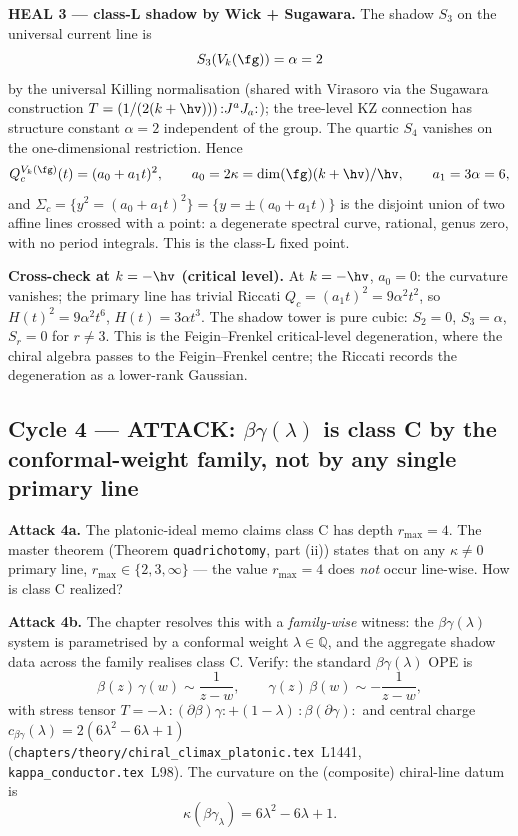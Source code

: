 \textbf{HEAL 3 --- class-L shadow by Wick + Sugawara.} The shadow
$S_3$ on the universal current line is
\[
  S_3(V_k(\fg)) = \alpha = 2
\]
by the universal Killing normalisation (shared with Virasoro via the
Sugawara construction $T = (1/(2(k+\hv)))\,{:}J^a J_a{:}$); the
tree-level KZ connection has structure constant $\alpha = 2$
independent of the group. The quartic $S_4$ vanishes on the
one-dimensional restriction. Hence
\[
  Q_c^{V_k(\fg)}(t) = (a_0 + a_1 t)^2,
  \qquad a_0 = 2\kappa = \dim(\fg)(k+\hv)/\hv,
  \qquad a_1 = 3\alpha = 6,
\]
and $\Sigma_c = \{y^2 = (a_0+a_1 t)^2\} = \{y = \pm(a_0 + a_1 t)\}$
is the disjoint union of two affine lines crossed with a point: a
degenerate spectral curve, rational, genus zero, with no period
integrals. This is the class-L fixed point.

\textbf{Cross-check at $k = -\hv$ (critical level).} At $k = -\hv$,
$a_0 = 0$: the curvature vanishes; the primary line has trivial
Riccati $Q_c = (a_1 t)^2 = 9\alpha^2 t^2$, so $H(t)^2 = 9\alpha^2 t^6$,
$H(t) = 3\alpha t^3$. The shadow tower is pure cubic: $S_2 = 0$,
$S_3 = \alpha$, $S_r = 0$ for $r \ne 3$. This is the Feigin--Frenkel
critical-level degeneration, where the chiral algebra passes to the
Feigin--Frenkel centre; the Riccati records the degeneration as a
lower-rank Gaussian.

\subsection*{Cycle 4 --- ATTACK: $\beta\gamma(\lambda)$ is
class C by the conformal-weight family, not by any single primary line}

\textbf{Attack 4a.} The platonic-ideal memo claims class C has depth
$r_{\max} = 4$. The master theorem (Theorem
\texttt{quadrichotomy}, part (ii)) states that on any $\kappa \ne 0$
primary line, $r_{\max} \in \{2, 3, \infty\}$ --- the value $r_{\max}
= 4$ does \emph{not} occur line-wise. How is class C realized?

\textbf{Attack 4b.} The chapter resolves this with a \emph{family-wise}
witness: the $\beta\gamma(\lambda)$ system is parametrised by a
conformal weight $\lambda \in \mathbb Q$, and the aggregate shadow
data across the family realises class C. Verify: the standard
$\beta\gamma(\lambda)$ OPE is
\[
  \beta(z)\,\gamma(w) \sim \frac{1}{z-w},
  \qquad
  \gamma(z)\,\beta(w) \sim -\frac{1}{z-w},
\]
with stress tensor $T = -\lambda\,{:}(\partial\beta)\gamma{:} +
(1-\lambda)\,{:}\beta(\partial\gamma){:}$ and central charge
$c_{\beta\gamma}(\lambda) = 2(6\lambda^2 - 6\lambda + 1)$
(\texttt{chapters/theory/chiral\_climax\_platonic.tex}~L1441,
\texttt{kappa\_conductor.tex}~L98). The curvature on the
(composite) chiral-line datum is
\[
  \kappa(\beta\gamma_\lambda) = 6\lambda^2 - 6\lambda + 1.
\]

